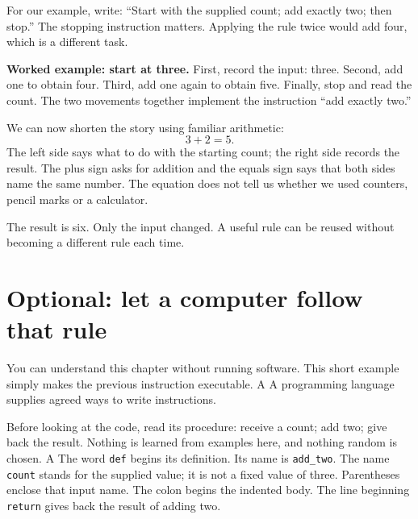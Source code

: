  For our example, write: “Start with the supplied count; add exactly two; then stop.” The stopping instruction matters. Applying the rule twice would add four, which is a different task.

\textbf{Worked example: start at three.}
First, record the input: three. Second, add one to obtain four. Third, add one again to obtain five. Finally, stop and read the count. The two movements together implement the instruction “add exactly two.”

We can now shorten the story using familiar arithmetic:
\[
3+2=5.
\]
The left side says what to do with the starting count; the right side records the result. The plus sign asks for addition and the equals sign says that both sides name the same number. The equation does not tell us whether we used counters, pencil marks or a calculator.

The result is six. Only the input changed. A useful rule can be reused without becoming a different rule each time.

\clearpage
\section{Optional: let a computer follow that rule}\label{sec:code}
You can understand this chapter without running software. This short example simply makes the previous instruction executable. A   A programming language supplies agreed ways to write instructions.

Before looking at the code, read its procedure: receive a count; add two; give back the result. Nothing is learned from examples here, and nothing random is chosen.
A  The word \texttt{def} begins its definition. Its name is \texttt{add\_two}. The name \texttt{count} stands for the supplied value; it is not a fixed value of three. Parentheses enclose that input name. The colon begins the indented body. The line beginning \texttt{return} gives back the result of adding two.

